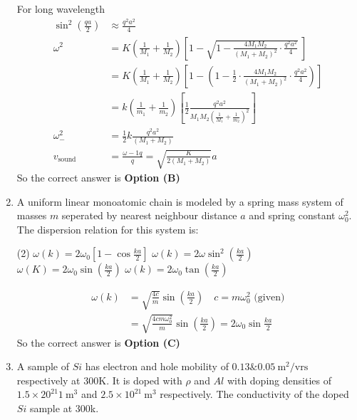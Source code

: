 \begin{enumerate}
\begin{answer}
	For long wavelength
	\begin{align*}
	\sin ^{2}\left(\frac{q a}{2}\right) &\approx \frac{q^{2} a^{2}}{4}\\
	\omega^{2}&=K\left(\frac{1}{M_{1}}+\frac{1}{M_{2}}\right)\left[1-\sqrt{1-\frac{4 M_{1} M_{2}}{\left(M_{1}+M_{2}\right)^{2}} \cdot \frac{q^{2} a^{2}}{4}}\ \right]\\
	&=K\left(\frac{1}{M_{1}}+\frac{1}{M_{2}}\right)\left[1-\left(1-\frac{1}{2} \cdot \frac{4 M_{1} M_{2}}{\left(M_{1}+M_{2}\right)^{2}} \cdot \frac{q^{2} a^{2}}{4}\right)\right]\\
	&=k\left(\frac{1}{m_{1}}+\frac{1}{m_{2}}\right)\left[\frac{1}{2} \frac{q^{2} a^{2}}{M_{1} M_{2}\left(\frac{1}{M_{1}}+\frac{1}{m_{2}}\right)^{2}}\right]\\
	\omega_{-}^{2}&=\frac{1}{2} k \frac{q^{2} a^{2}}{\left(M_{1}+M_{2}\right)}\\
	v_{\text {sound }}&=\frac{\omega-1 q}{q}=\sqrt{\frac{K}{2\left(M_{1}+M_{2}\right)}} a
	\end{align*}
	So the correct answer is \textbf{Option (B)}
\end{answer}
\item A uniform linear monoatomic chain is modeled by a spring mass system of masses $m$ seperated by nearest neighbour distance $a$ and spring constant $\omega_{0}^{2}$. The dispersion relation for this system is:
	\begin{tasks}(2)
		\task[\textbf{a.}]$\omega(k)=2 \omega_{0}\left[1-\cos \frac{k a}{2}\right]$
		\task[\textbf{b.}]$\omega(k)=2 \omega \sin ^{2}\left(\frac{k a}{2}\right)$
		\task[\textbf{c.}]$\omega(K)=2 \omega_{0} \sin \left(\frac{k a}{2}\right)$
		\task[\textbf{d.}] $\omega(k)=2 \omega_{0} \tan \left(\frac{k a}{2}\right)$
	\end{tasks}
\begin{answer}
	\begin{align*}
	\omega(k)&=\sqrt{\frac{4 c}{m}} \sin \left(\frac{k a}{2}\right)\quad c=m \omega_{0}^{2}\text{ (given)}\\
	&=\sqrt{\frac{4 cm\omega^{2}_0}{m}} \sin \left(\frac{k a}{2}\right)=2 \omega_{0} \sin \frac{k a}{2}
	\end{align*}
	So the correct answer is \textbf{Option (C)}
\end{answer}
\item A sample of $Si$ has electron and hole mobility of $0.13 \& 0.05 \mathrm{~m}^{2} / \mathrm{vrs}$ respectively at $300 $K.  It is doped with $\rho$ and $Al$ with doping densities of $1.5 \times 20^{21} 1 \mathrm{~m}^{3}$ and $2.5 \times 10^{21} \mathrm{~m}^{3}$ respectively. The conductivity of the doped $Si$ sample at $300$k.

\end{enumerate}
